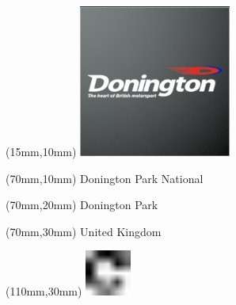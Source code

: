 \null\newpage
\begin{textblock*}{50mm}(15mm,10mm)%
\includegraphics[width=50mm]{LG/2015-05-20_00080.png}
\end{textblock*}
\begin{textblock*}{130mm}(70mm,10mm)%
{\fontsize{20}{20}\selectfont Donington Park National}\\
\end{textblock*}
\begin{textblock*}{120mm}(70mm,20mm)%
{\fontsize{16}{16}\selectfont Donington Park}\\
\end{textblock*}
\begin{textblock*}{120mm}(70mm,30mm)%
{\fontsize{12}{12}\selectfont United Kingdom}
\end{textblock*}
\begin{textblock*}{30mm}(110mm,30mm)%
\centering
\includegraphics[height=15mm]{icons/fa-rotate-right.pdf}
\end{textblock*}

